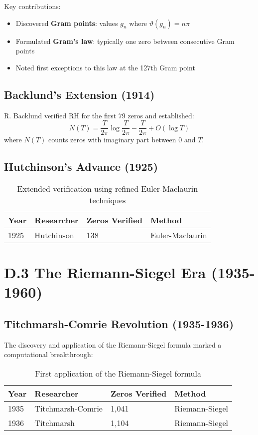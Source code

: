Key contributions:
\begin{itemize}
\item Discovered \textbf{Gram points}: values $g_n$ where $\vartheta(g_n) = n\pi$
\item Formulated \textbf{Gram's law}: typically one zero between consecutive Gram points
\item Noted first exceptions to this law at the 127th Gram point
\end{itemize}

\subsection{Backlund's Extension (1914)}

R. Backlund verified RH for the first 79 zeros and established:
\begin{equation}
N(T) = \frac{T}{2\pi}\log\frac{T}{2\pi} - \frac{T}{2\pi} + O(\log T)
\end{equation}
where $N(T)$ counts zeros with imaginary part between 0 and $T$.

\subsection{Hutchinson's Advance (1925)}

\begin{table}[h]
\centering
\begin{tabular}{|l|l|l|l|}
\hline
\textbf{Year} & \textbf{Researcher} & \textbf{Zeros Verified} & \textbf{Method} \\
\hline
1925 & Hutchinson & 138 & Euler-Maclaurin \\
\hline
\end{tabular}
\caption{Extended verification using refined Euler-Maclaurin techniques}
\end{table}

\section{D.3 The Riemann-Siegel Era (1935-1960)}

\subsection{Titchmarsh-Comrie Revolution (1935-1936)}

The discovery and application of the Riemann-Siegel formula marked a computational breakthrough:

\begin{table}[h]
\centering
\begin{tabular}{|l|l|l|l|}
\hline
\textbf{Year} & \textbf{Researcher} & \textbf{Zeros Verified} & \textbf{Method} \\
\hline
1935 & Titchmarsh-Comrie & 1,041 & Riemann-Siegel \\
1936 & Titchmarsh & 1,104 & Riemann-Siegel \\
\hline
\end{tabular}
\caption{First application of the Riemann-Siegel formula}
\end{table}

